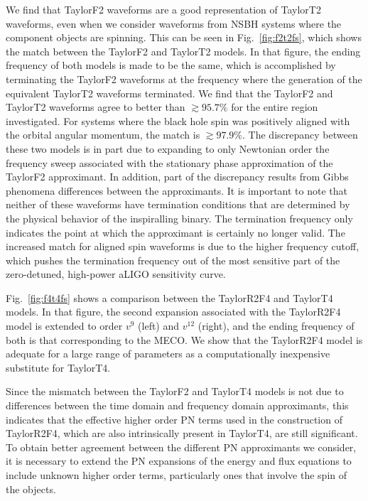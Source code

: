 We find that TaylorF2 waveforms are a good representation of
TaylorT2 waveforms, even when we consider waveforms from \ac{NSBH} systems
where the component objects are spinning. This can be seen in
Fig.~\ref{fig:f2t2fs}, which shows the match between the TaylorF2 and
TaylorT2 models. In that figure, the ending frequency of both models is made to
be the same, which is accomplished by terminating the TaylorF2 waveforms at the
frequency where the generation of the equivalent TaylorT2 waveforms terminated.
We find that the TaylorF2 and TaylorT2 waveforms agree to better than $\gtrsim
95.7\%$ for the entire region investigated. For systems where the black hole
spin was positively aligned with the orbital angular momentum, the match is
$\gtrsim 97.9\%$. The discrepancy between these two models is in part due to
expanding to only Newtonian order the frequency sweep associated with the
stationary phase approximation of the TaylorF2 approximant. In addition, part
of the discrepancy results from Gibbs phenomena differences between the
approximants.
It is important to note that neither of these waveforms have termination
conditions that are determined by the physical behavior of the inspiralling
binary. The termination frequency only indicates the point at which the
approximant is certainly no longer valid. The increased match for aligned spin
waveforms is due to the higher frequency cutoff, which pushes the termination
frequency out of the most sensitive part of the zero-detuned, high-power aLIGO
sensitivity curve.

Fig.~\ref{fig:f4t4fs} shows a comparison between the TaylorR2F4 and TaylorT4
models. In that figure, the second expansion associated with the TaylorR2F4
model is extended to order $v^{9}$ (left) and $v^{12}$ (right), and the ending frequency of both
is that corresponding to the \ac{MECO}.  We show that the TaylorR2F4 model is
adequate for a large range of parameters as a computationally inexpensive
substitute for TaylorT4. 

Since the mismatch between the TaylorF2 and TaylorT4 models is not due to
differences between the time domain and frequency domain approximants, this
indicates that the effective higher order \ac{PN} terms used in the
construction of TaylorR2F4, which are also intrinsically present in TaylorT4,
are still significant. To obtain better agreement between the
different \ac{PN} approximants we consider, it is necessary to extend the
\ac{PN} expansions of the energy and flux equations to include 
unknown higher order terms, particularly ones that involve 
the spin of the objects. 

